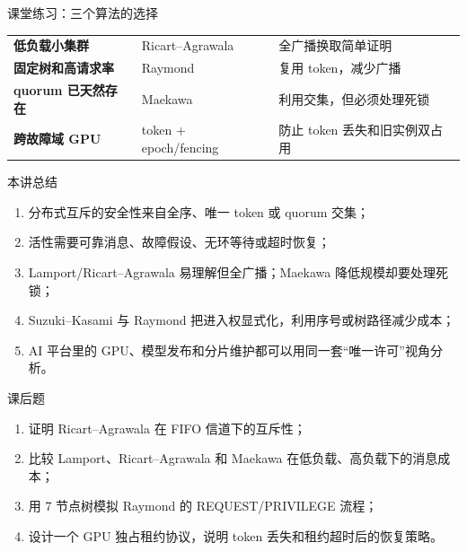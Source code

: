\documentclass[UTF8,fontset=none,aspectratio=169,10pt]{beamer}
\begin{document}
\begin{frame}{课堂练习：三个算法的选择}
\begin{tabularx}{\linewidth}{>{\bfseries}p{3.2cm}XX}
\toprule
低负载小集群 & Ricart--Agrawala & 全广播换取简单证明 \\
固定树和高请求率 & Raymond & 复用 token，减少广播 \\
quorum 已天然存在 & Maekawa & 利用交集，但必须处理死锁 \\
跨故障域 GPU & token + epoch/fencing & 防止 token 丢失和旧实例双占用 \\
\bottomrule
\end{tabularx}
\end{frame}

\begin{frame}{本讲总结}
\begin{enumerate}
  \item 分布式互斥的安全性来自全序、唯一 token 或 quorum 交集；
  \item 活性需要可靠消息、故障假设、无环等待或超时恢复；
  \item Lamport/Ricart--Agrawala 易理解但全广播；Maekawa 降低规模却要处理死锁；
  \item Suzuki--Kasami 与 Raymond 把进入权显式化，利用序号或树路径减少成本；
  \item AI 平台里的 GPU、模型发布和分片维护都可以用同一套“唯一许可”视角分析。
\end{enumerate}
\vfill
{}
\end{frame}

\begin{frame}{课后题}
\begin{enumerate}
  \item 证明 Ricart--Agrawala 在 FIFO 信道下的互斥性；
  \item 比较 Lamport、Ricart--Agrawala 和 Maekawa 在低负载、高负载下的消息成本；
  \item 用 7 节点树模拟 Raymond 的 REQUEST/PRIVILEGE 流程；
  \item 设计一个 GPU 独占租约协议，说明 token 丢失和租约超时后的恢复策略。
\end{enumerate}
\end{frame}
\end{document}
